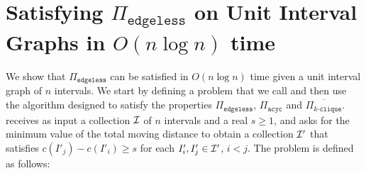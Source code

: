 \section{Satisfying \texorpdfstring{$\Pi_{\texttt{edgeless}}$}{} on Unit Interval Graphs in \texorpdfstring{$O(n\log n)$}{} time}\label{sec:edg_uig}

We show that $\Pi_{\texttt{edgeless}}$ can be satisfied in $O(n\log n)$ time given a unit interval graph of $n$ intervals.
We start by defining a problem that we call {\idisp} and then use the algorithm designed to satisfy the properties $\Pi_{\texttt{edgeless}}$, $\Pi_{\texttt{acyc}}$ and $\overline{\Pi_{k\texttt{-clique}}}$. %
\ifConf
{\idisp} receives as input a collection $\mathcal{I}$ of $n$ intervals and a real $s \ge 1$, and asks for the minimum value of the total moving distance to obtain a collection $\mathcal{I}'$ that satisfies $c(I'_j)-c(I'_i) \ge s$ for each $I'_i, I'_j \in \mathcal{I}'$, $i<j$.
\fi
\ifFull
The problem is defined as follows:

